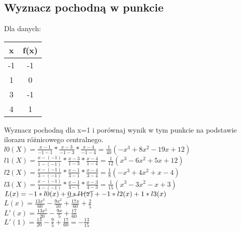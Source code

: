 \documentclass{article}
\begin{document}
\subsection{Wyznacz pochodną w punkcie}
Dla danych:
\begin{table}[H]
\begin{tabular}{|c|c|}
\hline
x  & f(x) \\ \hline
-1 & -1   \\ \hline
1  & 0    \\ \hline
3  & -1   \\ \hline
4  & 1    \\ \hline
\end{tabular}
\end{table}
Wyznacz pochodną dla x=1 i porównaj wynik w tym punkcie na podstawie ilorazu różnicowego centralnego.\\
$l0(X)=\frac{x-1}{-1-1}*\frac{x-3}{-1-3}*\frac{x-4}{-1-4} = \frac{1}{40}(-x^3+8x^2-19x+12)$\\
$l1(X)=\frac{x- (-1)}{1- (-1)}*\frac{x-3}{1-3}*\frac{x-4}{1-4} = \frac{1}{12}(x^3-6x^2+5x+12)$\\
$l2(X)=\frac{x- (-1)}{3- (-1)}*\frac{x-1}{3-1}*\frac{x-4}{3-4} = \frac{1}{8}(-x^3+4x^2+x-4)$\\
$l3(X)=\frac{x- (-1)}{4- (-1)}*\frac{x-1}{4-1}*\frac{x-3}{4-3} = \frac{1}{15}(x^3-3x^2-x+3)$\\
$L(x)=-1*l0(x)+\cancel{0*l1(x)}+-1*l2(x)+1*l3(x)$\\
$L(x)=\frac{13x^3}{60}-\frac{9x^2}{10}+\frac{17x}{60}+\frac{2}{5}$\\
$L'(x)=\frac{13x^2}{20}-\frac{9x}{5}+\frac{17}{60}$\\
$L'(1)=\frac{13}{20}-\frac{9}{5}+\frac{17}{60}=-\frac{13}{15}$
\end{document}
